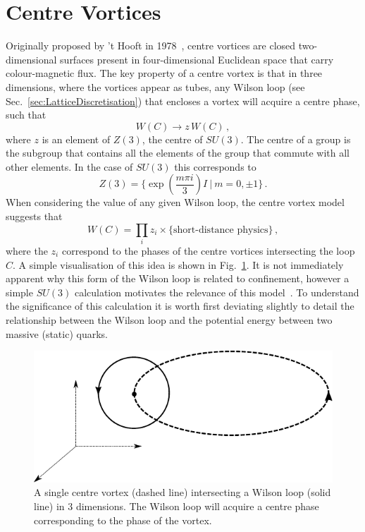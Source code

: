 \section{Centre Vortices}
Originally proposed by 't Hooft in 1978~\cite{'tHooft:1977hy,'tHooft:1979uj}, centre vortices are closed two-dimensional surfaces present in four-dimensional Euclidean space that carry colour-magnetic flux. The key property of a centre vortex is that in three dimensions, where the vortices appear as tubes, any Wilson loop (see Sec.~\ref{sec:LatticeDiscretisation}) that encloses a vortex will acquire a centre phase, such that
%
\begin{equation}
W(C)\rightarrow z \,W(C)\, ,
\end{equation}
%
where $z$ is an element of $Z(3)$, the centre of $SU(3)$. The centre of a group is the subgroup that contains all the elements of the group that commute with all other elements. In the case of $SU(3)$ this corresponds to
%
\begin{equation}
Z(3) = \big\lbrace \exp\left(\frac{m\pi i}{3} \right)I ~ | ~ m = 0,\pm 1\big\rbrace\, . 
\end{equation}
%
When considering the value of any given Wilson loop, the centre vortex model suggests that
%
\begin{equation}
W(C) = \prod_i z_i\times \lbrace\text{short-distance physics}\rbrace\, ,
\end{equation}
%
where the $z_i$ correspond to the phases of the centre vortices intersecting the loop $C$. A simple visualisation of this idea is shown in Fig.~\ref{fig:CentreVortex}. It is not immediately apparent why this form of the Wilson loop is related to confinement, however a simple $SU(3)$ calculation motivates the relevance of this model~\cite{Greensite:2016pfc}. To understand the significance of this calculation it is worth first deviating slightly to detail the relationship between the Wilson loop and the potential energy between two massive (static) quarks.\\
% 
\begin{figure}
\centering
\includegraphics[width=\linewidth]{./centre_vortex.pdf}
\caption{\label{fig:CentreVortex} A single centre vortex (dashed line) intersecting a Wilson loop (solid line) in 3 dimensions. The Wilson loop will acquire a centre phase corresponding to the phase of the vortex.}
\end{figure}
%

